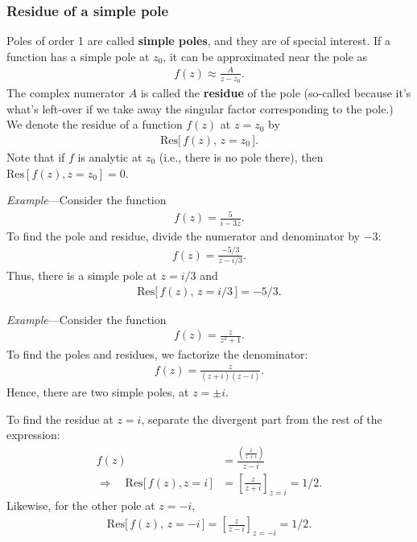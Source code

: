 \documentclass[10pt,a4paper]{article}
\begin{document}
\subsubsection{Residue of a simple pole}
\label{residue-of-a-simple-pole}

Poles of order 1 are called \textbf{simple poles}, and they are of
special interest. If a function has a simple pole at $z_0$, it can be
approximated near the pole as
\begin{align}
  f(z) \approx \frac{A}{z-z_0}.
\end{align}
The complex numerator $A$ is called the \textbf{residue} of the pole
(so-called because it's what's left-over if we take away the singular
factor corresponding to the pole.) We denote the residue of a function
$f(z)$ at $z = z_0$ by
\begin{align}
  \mathrm{Res}\big[\,f(z), \, z = z_0\,\big].
\end{align}
Note that if $f$ is analytic at $z_0$ (i.e., there is no pole there),
then $\mathrm{Res}[f(z), z = z_0] = 0$.

\begin{framed}\noindent
  \textit{Example}---Consider the function
  \begin{align}
    f(z) = \frac{5}{i-3z}.
  \end{align}
To find the pole and residue, divide the numerator and denominator by $-3$:
\begin{align}
  f(z) = \frac{-5/3}{z-i/3}.
\end{align}
Thus, there is a simple pole at $z = i/3$ and
\begin{align}
  \mathrm{Res}\big[\,f(z),\, z = i/3\,\big] = - 5/3.
\end{align}
\end{framed}

\begin{framed}\noindent
  \textit{Example}---Consider the function
  \begin{align}
    f(z) = \frac{z}{z^2 + 1}.
  \end{align}
To find the poles and residues, we factorize the denominator:
\begin{align}
  f(z) = \frac{z}{(z+i)(z-i)}.
\end{align}
Hence, there are two simple poles, at $z = \pm i$.

To find the residue at $z = i$, separate the divergent part from the
rest of the expression:
\begin{align}
  f(z) &= \frac{\left(\frac{z}{z+i}\right)}{z-i} \\
  \Rightarrow\quad \mathrm{Res}\big[\,f(z), z=i\,\big]
  &= \left[\frac{z}{z+i}\right]_{z=i} = 1/2.
\end{align}
Likewise, for the other pole at $z = -i$,
\begin{align}
  \mathrm{Res}\big[\,f(z), \, z = -i\,\big] = \left[\frac{z}{z-i}\right]_{z=-i} = 1/2.
\end{align}
\end{framed}
\end{document}
